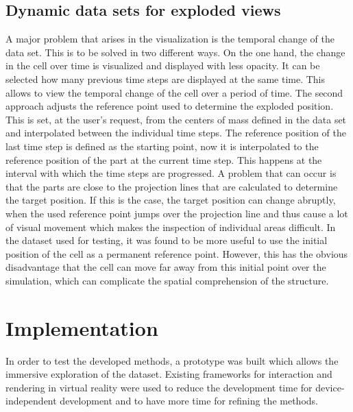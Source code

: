 \subsection{Dynamic data sets for exploded views}

A major problem that arises in the visualization is the temporal change of the data set. This is to be solved in two different ways.
On the one hand, the change in the cell over time is visualized and displayed with less opacity.
It can be selected how many previous time steps are displayed at the same time.
This allows to view the temporal change of the cell over a period of time.
The second approach adjusts the reference point used to determine the exploded position. 
This is set, at the user's request, from the centers of mass defined in the data set and interpolated between the individual time steps.
The reference position of the last time step is defined as the starting point, now it is interpolated to the reference position of the part at the current time step. This happens at the interval with which the time steps are progressed. 
A problem that can occur is that the parts are close to the projection lines that are calculated to determine the target position. 
If this is the case, the target position can change abruptly, when the used reference point jumps over the projection line and thus cause a lot of visual movement which makes the inspection of individual areas difficult.  
In the dataset used for testing, it was found to be more useful to use the initial position of the cell as a permanent reference point. 
However, this has the obvious disadvantage that the cell can move far away from this initial point over the simulation, which can complicate the spatial comprehension of the structure. 


\section{Implementation}

In order to test the developed methods, a prototype was built which allows the immersive exploration of the dataset. Existing frameworks for interaction and rendering in virtual reality were used to reduce the development time for device-independent development and to have more time for refining the methods.

